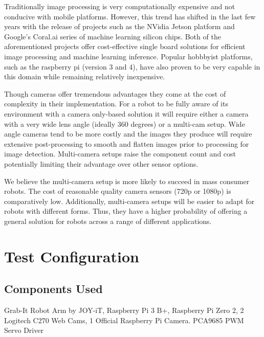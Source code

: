 \documentclass[conference]{IEEEtran}
\begin{document}
Traditionally image processing is very computationally expensive and not conducive with mobile platforms. However, this trend has shifted in the last few years with the release of projects such as the NVidia Jetson platform and Google's Coral.ai series of machine learning silicon chips. Both of the aforementioned projects offer cost-effective single board solutions for efficient image processing and machine learning inference\cite{b5}. Popular hobbbyist platforms, such as the raspberry pi (version 3 and 4), have also proven to be very capable in this domain while remaining relatively inexpensive\cite{b6}.

Though cameras offer tremendous advantages they come at the cost of complexity in their implementation. For a robot to be fully aware of its environment with a camera only-based solution it will require either a camera with a very wide lens angle (ideally 360 degrees) or a multi-cam setup. Wide angle cameras tend to be more costly and the images they produce will require extensive post-processing to smooth and flatten images prior to processing for image detection. Multi-camera setups raise the component count and cost potentially limiting their advantage over other sensor options\cite{b7}.

We believe the multi-camera setup is more likely to succeed in mass consumer robots. The cost of reasonable quality camera sensors (720p or 1080p) is comparatively low. Additionally, multi-camera setups will be easier to adapt for robots with different forms. Thus, they have a higher probability of offering a general solution for robots across a range of different applications.



\section{Test Configuration}

\subsection{Components Used}
Grab-It Robot Arm by JOY-iT, Raspberry Pi 3 B+, Raspberry Pi Zero 2, 2 Logitech C270 Web Cams, 1 Official Raspberry Pi Camera. PCA9685 PWM Servo Driver
\end{document}
